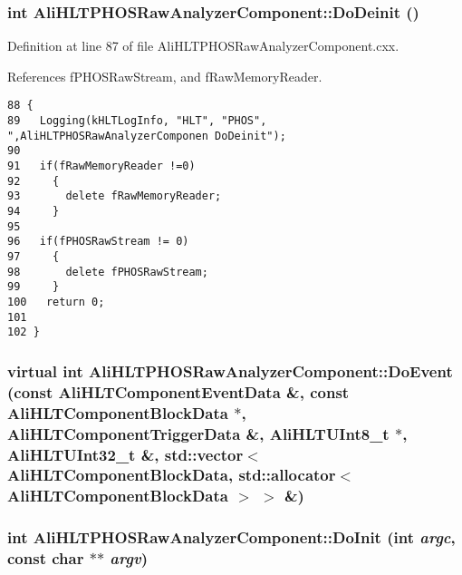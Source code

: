 \subsubsection{\setlength{\rightskip}{0pt plus 5cm}int Ali\-HLTPHOSRaw\-Analyzer\-Component::Do\-Deinit ()\hspace{0.3cm}{\tt  [virtual]}}\label{classAliHLTPHOSRawAnalyzerComponent_AliHLTPHOSRawAnalyzerPeakFinderComponenta6}




Definition at line 87 of file Ali\-HLTPHOSRaw\-Analyzer\-Component.cxx.

References f\-PHOSRaw\-Stream, and f\-Raw\-Memory\-Reader.

\footnotesize\begin{verbatim}88 {
89   Logging(kHLTLogInfo, "HLT", "PHOS", ",AliHLTPHOSRawAnalyzerComponen DoDeinit");
90 
91   if(fRawMemoryReader !=0)
92     {
93       delete fRawMemoryReader;
94     }
95     
96   if(fPHOSRawStream != 0)
97     {
98       delete fPHOSRawStream;
99     }
100   return 0;
101 
102 }
\end{verbatim}\normalsize 


\subsubsection{\setlength{\rightskip}{0pt plus 5cm}virtual int Ali\-HLTPHOSRaw\-Analyzer\-Component::Do\-Event (const Ali\-HLTComponent\-Event\-Data \&, const Ali\-HLTComponent\-Block\-Data $\ast$, Ali\-HLTComponent\-Trigger\-Data \&, Ali\-HLTUInt8\_\-t $\ast$, Ali\-HLTUInt32\_\-t \&, std::vector$<$ Ali\-HLTComponent\-Block\-Data, std::allocator$<$ Ali\-HLTComponent\-Block\-Data $>$ $>$ \&)\hspace{0.3cm}{\tt  [virtual]}}\label{classAliHLTPHOSRawAnalyzerComponent_AliHLTPHOSRawAnalyzerPeakFinderComponenta16}


\subsubsection{\setlength{\rightskip}{0pt plus 5cm}int Ali\-HLTPHOSRaw\-Analyzer\-Component::Do\-Init (int {\em argc}, const char $\ast$$\ast$ {\em argv})\hspace{0.3cm}{\tt  [virtual]}}\label{classAliHLTPHOSRawAnalyzerComponent_AliHLTPHOSRawAnalyzerPeakFinderComponenta4}




